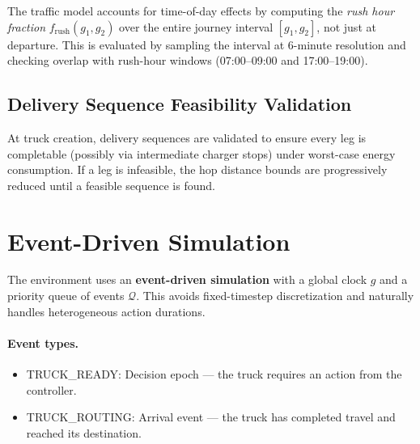\documentclass[11pt]{article}
\begin{document}
The traffic model accounts for time-of-day effects by computing the \emph{rush hour fraction} $f_{\text{rush}}(g_1,g_2)$ over the entire journey interval $[g_1,g_2]$, not just at departure. This is evaluated by sampling the interval at 6-minute resolution and checking overlap with rush-hour windows (07:00--09:00 and 17:00--19:00).

\subsection{Delivery Sequence Feasibility Validation}

At truck creation, delivery sequences are validated to ensure every leg is completable (possibly via intermediate charger stops) under worst-case energy consumption. If a leg is infeasible, the hop distance bounds are progressively reduced until a feasible sequence is found.

\section{Event-Driven Simulation}\label{sec:simulation}

The environment uses an \textbf{event-driven simulation} with a global clock $g$ and a priority queue of events $\mathcal{Q}$. This avoids fixed-timestep discretization and naturally handles heterogeneous action durations.

\paragraph{Event types.}
\begin{itemize}[nosep]
    \item \textsc{TRUCK\_READY}: Decision epoch --- the truck requires an action from the controller.
    \item \textsc{TRUCK\_ROUTING}: Arrival event --- the truck has completed travel and reached its destination.
\end{itemize}
\end{document}
